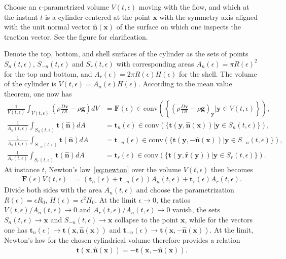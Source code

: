 \begin{example}
    Choose an $\epsilon$-parametrized volume $V(t,\epsilon)$ moving with the flow, and which at the instant $t$ is a cylinder centered at the point $\bm{x}$ with the symmetry axis aligned with the unit normal vector $\bm{\hat{n}}(\bm{x})$ of the surface on which one inspects the traction vector. See the figure for clarification.
    \begin{center}
         
    \end{center}
    Denote the top, bottom, and shell surfaces of the cylinder as the sets of points $S_n(t,\epsilon)$, $S_{-n}(t,\epsilon)$ and $S_r(t,\epsilon)$ with corresponding areas $A_n(\epsilon)=\pi R(\epsilon)^2$ for the top and bottom, and $A_r(\epsilon)=2\pi R(\epsilon)H(\epsilon)$ for the shell. The volume of the cylinder is $V(t,\epsilon)=A_n(\epsilon)H(\epsilon)$. According to the mean value theorem, one now has
    \begin{align*}
        \frac{1}{V(t,\epsilon)}\int_{V(t,\epsilon)}\left(\rho\frac{D\bm{v}}{Dt}-\rho\bm{g}\right)dV&=\bm{F}(\epsilon)\in \text{conv}\left(\left\{\left(\rho\frac{D\bm{v}}{Dt}-\rho\bm{g}\right)_{\bm{y}}|\bm{y}\in V(t,\epsilon)\right\}\right),
        \\
        \frac{1}{A_n(t,\epsilon)}\int_{S_n(t,\epsilon)}\bm{t}(\bm{\hat{n}})dA&= \bm{t}_n(\epsilon)\in\text{conv}(\{\bm{t}(\bm{y},\bm{\hat{n}}(\bm{x}))|\bm{y}\in S_n(t,\epsilon)\}),
        \\
        \frac{1}{A_n(t,\epsilon)}\int_{S_{-n}(t,\epsilon)}\bm{t}(\bm{\hat{n}})dA&=\bm{t}_{-n}(\epsilon)\in \text{conv}(\{\bm{t}(\bm{y},-\bm{\hat{n}}(\bm{x}))|\bm{y}\in S_{-n}(t,\epsilon)\}),\\
        \frac{1}{A_r(t,\epsilon)}\int_{S_r(t,\epsilon)}\bm{t}(\bm{\hat{n}})dA&=\bm{t}_r(\epsilon)\in \text{conv}(\{\bm{t}(\bm{y},\bm{\hat{r}}(\bm{y}))|\bm{y}\in S_r(t,\epsilon)\}).
    \end{align*}
    At instance $t$, Newton's law~\eqref{eq:newton} over the volume $V(t,\epsilon)$ then becomes
    \begin{align*}
        \bm{F}(\epsilon) V(t,\epsilon)&=(\bm{t}_n(\epsilon)+\bm{t}_{-n}(\epsilon))A_n(t,\epsilon)+\bm{t}_r(\epsilon)A_r(t,\epsilon).
    \end{align*} 
    Divide both sides with the area $A_n(t,\epsilon)$ and choose the parametrization $R(\epsilon)=\epsilon R_0$, $H(\epsilon)=\epsilon^2H_0$. At the limit $\epsilon\to 0$, the ratios $V(t,\epsilon)/A_n(t,\epsilon)\to 0$ and $A_r(t,\epsilon)/A_n(t,\epsilon)\to 0$ vanish, the sets $S_n(t,\epsilon)\to \bm{x}$ and $S_{-n}(t,\epsilon)\to\bm{x}$ collapse to the point $\bm{x}$, while for the vectors one has $\bm{t}_n(\epsilon)\to\bm{t}(\bm{x},\bm{\hat{n}}(\bm{x}))$ and $\bm{t}_{-n}(\epsilon)\to\bm{t}(\bm{x},-\bm{\hat{n}}(\bm{x}))$. At the limit, Newton's law for the chosen cylindrical volume therefore provides a relation
    \begin{align*}
        \bm{t}(\bm{x},\bm{\hat{n}}(\bm{x}))=-\bm{t}(\bm{x},-\bm{\hat{n}}(\bm{x})).
    \end{align*}
    

\end{example}
